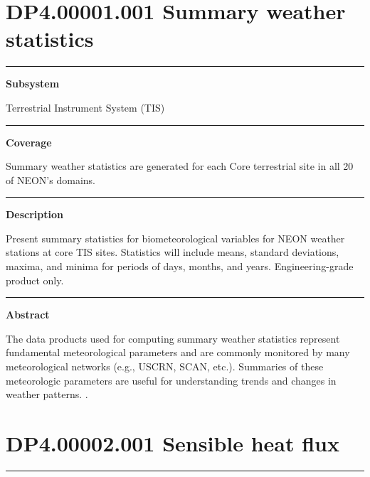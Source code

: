 \documentclass[]{article}
\begin{document}
\section{DP4.00001.001 Summary weather
statistics}\label{dp4.00001.001-summary-weather-statistics}

\begin{center}\rule{0.5\linewidth}{\linethickness}\end{center}

\textbf{Subsystem}

Terrestrial Instrument System (TIS)

\begin{center}\rule{0.5\linewidth}{\linethickness}\end{center}

\textbf{Coverage}

Summary weather statistics are generated for each Core terrestrial site
in all 20 of NEON's domains.

\begin{center}\rule{0.5\linewidth}{\linethickness}\end{center}

\textbf{Description}

Present summary statistics for biometeorological variables for NEON
weather stations at core TIS sites. Statistics will include means,
standard deviations, maxima, and minima for periods of days, months, and
years. Engineering-grade product only.

\begin{center}\rule{0.5\linewidth}{\linethickness}\end{center}

\textbf{Abstract}

The data products used for computing summary weather statistics
represent fundamental meteorological parameters and are commonly
monitored by many meteorological networks (e.g., USCRN, SCAN, etc.).
Summaries of these meteorologic parameters are useful for understanding
trends and changes in weather patterns. \newpage
.

\section{DP4.00002.001 Sensible heat
flux}\label{dp4.00002.001-sensible-heat-flux}

\begin{center}\rule{0.5\linewidth}{\linethickness}\end{center}
\end{document}
